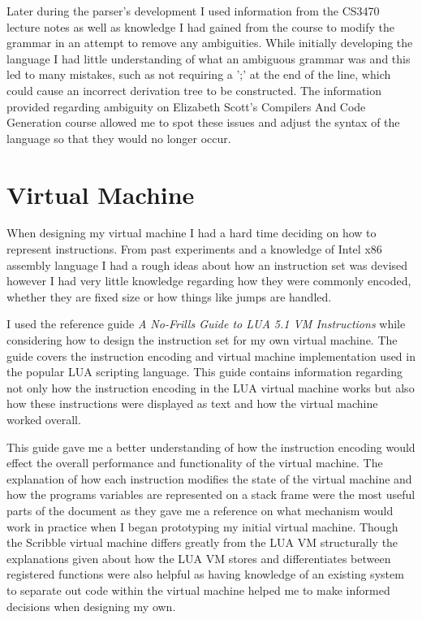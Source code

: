 \documentclass[]{final_report}
\begin{document}
Later during the parser's development I used information from the CS3470 lecture notes\cite{CS3470} as well as knowledge I had gained from the course to modify the grammar in an attempt to remove any ambiguities. While initially developing the language I had little understanding of what an ambiguous grammar was and this led to many mistakes, such as not requiring a ';' at the end of the line, which could cause an incorrect derivation tree to be constructed. The information provided regarding ambiguity on Elizabeth Scott's Compilers And Code Generation course allowed me to spot these issues and adjust the syntax of the language so that they would no longer occur.

\section{Virtual Machine}

When designing my virtual machine I had a hard time deciding on how to represent instructions. From past experiments and a knowledge of Intel x86 assembly language I had a rough ideas about how an instruction set was devised however I had very little knowledge regarding how they were commonly encoded, whether they are fixed size or how things like jumps are handled.

I used the reference guide \emph{A No-Frills Guide to LUA 5.1 VM Instructions}\cite{NOFRILLLUA} while considering how to design the instruction set for my own virtual machine. The guide covers the instruction encoding and virtual machine implementation used in the popular LUA scripting language. This guide contains information regarding not only how the instruction encoding in the LUA virtual machine works but also how these instructions were displayed as text and how the virtual machine worked overall.

This guide gave me a better understanding of how the instruction encoding would effect the overall performance and functionality of the virtual machine. The explanation of how each instruction modifies the state of the virtual machine and how the programs variables are represented on a stack frame were the most useful parts of the document as they gave me a reference on what mechanism would work in practice when I began prototyping my initial virtual machine. Though the Scribble virtual machine differs greatly from the LUA VM structurally the explanations given about how the LUA VM stores and differentiates between registered functions were also helpful as having knowledge of an existing system to separate out code within the virtual machine helped me to make informed decisions when designing my own.
\end{document}
